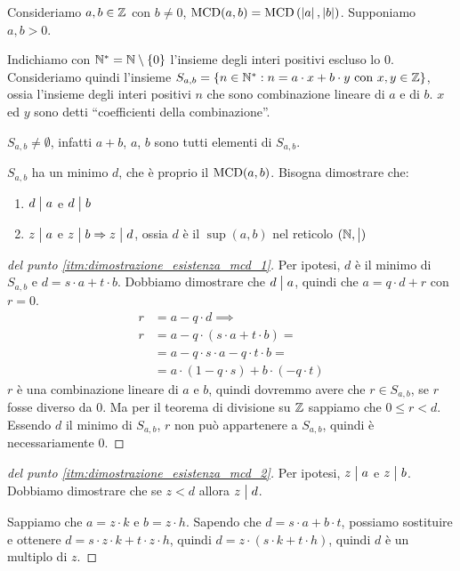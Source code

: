 Consideriamo $a, b \in \mathbb{Z}$ con $b \neq 0$, $\operatorname{MCD}(a, b) = \operatorname{MCD} \left( \left\lvert{a}\right\rvert, \left\lvert{b}\right\rvert \right)$. Supponiamo $a, b > 0$.

Indichiamo con $\mathbb{N}^{\ast} = \mathbb{N} \setminus \{ 0 \}$ l'insieme degli interi positivi escluso lo 0. Consideriamo quindi l'insieme $S_{a, b} = \{ n \in \mathbb{N}^{\ast} : n = a \cdot x + b \cdot y \text{ con } x, y \in \mathbb{Z}\}$, ossia l'insieme degli interi positivi $n$ che sono combinazione lineare di $a$ e di $b$. $x$ ed $y$ sono detti ``coefficienti della combinazione''.

$S_{a, b} \neq \emptyset$, infatti $a+b$, $a$, $b$ sono tutti elementi di $S_{a,b}$.

$S_{a,b}$ ha un minimo $d$, che \`e proprio il $\operatorname{MCD}(a,b)$. Bisogna dimostrare che:
\begin{enumerate}
    \item\label{itm:dimostrazione_esistenza_mcd_1} $d \bigm| a$ e $d \bigm| b$
    \item\label{itm:dimostrazione_esistenza_mcd_2} $z \bigm| a$ e $z \bigm| b \Rightarrow z \bigm| d$, ossia $d$ \`e il $\sup(a,b)$ nel reticolo $(\mathbb{N}, \bigm|)$
\end{enumerate}
\begin{proof}[del punto \ref{itm:dimostrazione_esistenza_mcd_1}]
Per ipotesi, $d$ \`e il minimo di $S_{a,b}$ e $d = s \cdot a + t \cdot b$. Dobbiamo dimostrare che $d \bigm| a$, quindi che $a = q \cdot d + r$ con $r = 0$.
\begin{align*}
r &= a - q \cdot d \implies \\
r &= a - q \cdot (s \cdot a + t \cdot b) = \\
&= a - q \cdot s \cdot a - q \cdot t \cdot b = \\
&= a \cdot (1 - q \cdot s) + b \cdot (-q \cdot t) 
\end{align*}
$r$ \`e una combinazione lineare di $a$ e $b$, quindi dovremmo avere che $r \in S_{a,b}$, se $r$ fosse diverso da 0. Ma per il teorema di divisione su $\mathbb{Z}$ sappiamo che $0 \le r < d$. Essendo $d$ il minimo di $S_{a,b}$, $r$ non pu\`o appartenere a $S_{a,b}$, quindi \`e necessariamente 0.
\end{proof}
\begin{proof}[del punto \ref{itm:dimostrazione_esistenza_mcd_2}]
Per ipotesi, $z \bigm| a$ e $z \bigm| b$. Dobbiamo dimostrare che se $z < d$ allora $z \bigm| d$.

Sappiamo che $a = z \cdot k$ e $b = z \cdot h$. Sapendo che $d = s \cdot a + b \cdot t$, possiamo sostituire e ottenere $d = s \cdot z \cdot k + t \cdot z \cdot h$, quindi $d = z \cdot ( s \cdot k + t \cdot h)$, quindi $d$ \`e un multiplo di $z$.
\end{proof}

